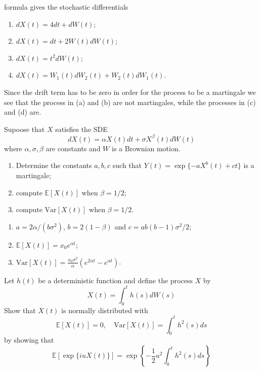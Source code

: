 \documentclass[12pt,a4paper]{exam}
\begin{document}
\begin{questions}
\begin{solution}
\ito formula gives the stochastic differentials 
\begin{enumerate}[label=(\alph*),font=\itshape]
\item $dX(t) = 4dt + dW(t) $;
\item $dX(t) = dt+2W(t)dW(t)$;
\item $dX(t) = t^2dW(t)$;
\item $dX(t) = W_1(t)dW_2(t) + W_2(t)dW_1(t)$.
\end{enumerate}
Since the drift term has to be zero in order for the process to be a martingale we see that the process in (a) and (b) are not martingales, while the processes in (c) and (d) are.
\end{solution}

\question Supoose that $X$ satisfies the SDE
\begin{equation*}
dX(t) = \alpha X(t)dt + \sigma X^{\beta}(t)dW(t)
\end{equation*}
where $\alpha, \sigma, \beta$ are constants and $W$ is a Brownian motion.
\begin{enumerate}[label=(\alph*),font=\itshape]
\item Determine the constants $a, b, c$ such that $Y(t) = \exp\{-a X^b(t) + ct\}$ is a martingale;
\item compute $\mathbb{E}[X(t)]$ when $\beta =1/2$;
\item compute $\text{Var}[X(t)]$ when $\beta =1/2$.
\end{enumerate}
\fillwithlines{3cm}

\begin{solution}
\begin{enumerate}[label=(\alph*),font=\itshape]
\item $a=2\alpha/(b\sigma^2)$, $b=2(1-\beta)$ and $c=ab(b-1)\sigma^2/2$;
\item $\mathbb{E}[X(t)] = x_0e^{\alpha t}$;
\item $\text{Var}[X(t)] = \frac{x_0\sigma^2}{\alpha}(e^{2\alpha t}-e^{\alpha t})$.
\end{enumerate}
\end{solution}

\question Let $h(t)$ be a deterministic function and define the process $X$ by
\begin{equation*}
X(t) = \int_0^t h(s) dW(s)
\end{equation*}
Show that $X(t)$ is normally distributed with 
\begin{equation*}
\mathbb{E}[X(t)] = 0, \quad \text{Var}[X(t)] = \int_0^t h^2(s) ds
\end{equation*}
by showing that 
\begin{equation*}
\mathbb{E}[\exp\{i u X(t)\}] = \exp\left\{-\frac{1}{2}u^2 \int_0^t h^2(s) ds\right\}
\end{equation*}
\fillwithlines{3cm}


\end{questions}
\end{document}
